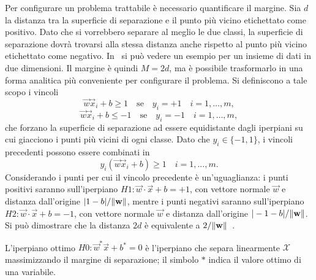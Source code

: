 Per configurare un problema trattabile è necessario quantificare il margine.
Sia $d$ la distanza tra la superficie di separazione e il punto più vicino etichettato come positivo. 
Dato che si vorrebbero separare al meglio le due classi, la superficie di separazione dovrà trovarsi alla stessa distanza anche rispetto al punto più vicino etichettato come negativo.
In~ si può vedere un esempio per un insieme di dati in due dimensioni.
Il margine è quindi $M=2d$, ma è possibile trasformarlo in una forma analitica più conveniente per configurare il problema.
Si definiscono a tale scopo i vincoli 
\begin{equation*}\label{eq:svc:hardmargin:margin_1}
    \Vec{w}\Vec{x}_i + b \geq 1 \quad \text{se} \quad y_i = +1 \quad  i=1,\dots,m,
\end{equation*}
\begin{equation*}
    \Vec{w}\Vec{x}_i + b \leq -1 \quad \text{se} \quad y_i = -1 \quad i=1,\dots,m,
\end{equation*}
che forzano la superficie di separazione ad essere equidistante dagli iperpiani su cui giacciono i punti più vicini di ogni classe.
Dato che $y_i\in\{-1,1\}$, i vincoli precedenti possono essere combinati in
\begin{equation*}
    y_i(\Vec{w}\Vec{x}_i + b) \geq 1 \quad i=1, ..., m.
\end{equation*}
Considerando i punti per cui il vincolo precedente è un'uguaglianza: i punti positivi saranno sull'iperpiano $H1: \vec{w}\cdot \vec{x} + b=+1$, con vettore normale $\vec{w}$ e distanza dall'origine $|1-b|/\norm{\vec{w}}$, mentre i punti negativi saranno sull'iperpiano $H2: \vec{w}\cdot \vec{x} + b=-1$, con vettore normale $\vec{w}$ e distanza dall'origine $|-1-b|/\norm{\vec{w}}$. Si può dimostrare che la distanza $2d$ è equivalente a $2/\norm{\vec{w}}$~\cite{svm_tutorial}.

L'iperpiano ottimo $H0: \Vec{w}^*\Vec{x} + b^* = 0$ è l'iperpiano che separa linearmente $\mathcal{X}$ massimizzando il margine di separazione; il simbolo $*$ indica il valore ottimo di una variabile.

